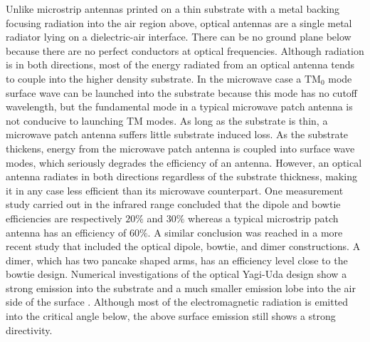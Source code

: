 \documentclass[11pt]{article}
\begin{document}

Unlike microstrip antennas printed on a thin substrate with a metal backing focusing radiation into the air region above, optical antennas are a single metal radiator lying on a dielectric-air interface. There can be no ground plane below because there are no perfect conductors at optical frequencies. Although radiation is in both directions, most of the energy radiated from an optical antenna tends to couple into the higher density substrate. In the microwave case a $\text{TM}_0$ mode surface wave can be launched into the substrate because this mode has no cutoff wavelength, but the fundamental mode in a typical microwave patch antenna is not conducive to launching TM modes. As long as the substrate is thin, a microwave patch antenna suffers little substrate induced loss. As the substrate thickens, energy from the microwave patch antenna is coupled into surface wave modes, which seriously degrades the efficiency of an antenna. However, an optical antenna radiates in both directions regardless of the substrate thickness, making it in any case less efficient than its microwave counterpart. One measurement study carried out in
the infrared range \cite{Fischer2008} concluded that the dipole and bowtie efficiencies are respectively $20 \%$ and $ 30 \%$ whereas a typical microstrip patch antenna has an efficiency of $60 \%$. A similar conclusion was reached in a more recent study \cite{9781107014145} that included the optical dipole, bowtie, and dimer constructions. A dimer, which has two pancake shaped arms, has an efficiency level close to the bowtie design. Numerical investigations of the optical Yagi-Uda design show a strong emission into the substrate and a much smaller emission lobe into the air side of the surface \cite{Hofmann2007} \cite{Kosako2010}. Although most of the electromagnetic radiation is emitted into the critical angle below, the above surface emission still shows a strong directivity.
\end{document}
